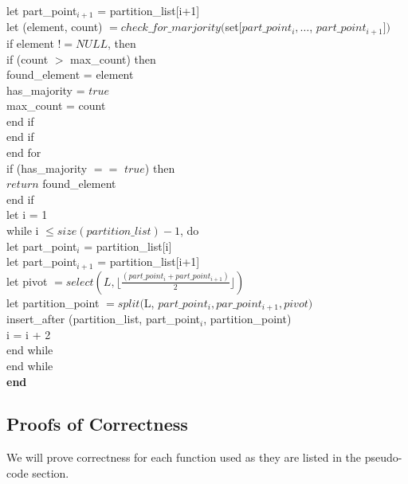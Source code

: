 \documentclass{article}
\begin{document}
      \indent\indent\indent let part\_point$_{i+1}$ = partition\_list[i+1] \\
      \indent\indent\indent let (element, count) $= check\_for\_marjority($set$[part\_point_{i}, \ldots$, $part\_point_{i+1}])$ \\
      \indent\indent\indent if element $!= NULL$, then \\
      \indent\indent\indent\indent if (count $>$ max\_count) then \\
      \indent\indent\indent\indent\indent found\_element = element \\
      \indent\indent\indent\indent\indent has\_majority = $true$ \\
      \indent\indent\indent\indent\indent max\_count = count \\
      \indent\indent\indent\indent end if \\
      \indent\indent\indent end if \\
      \indent\indent end for \\
      \indent\indent if (has\_majority $==$ $true$) then \\
      \indent\indent\indent $return$ found\_element \\
      \indent\indent end if \\
      \indent\indent let i = 1 \\
      \indent\indent while i $\leq size(partition\_list) - 1$, do \\ 
      \indent\indent\indent let part\_point$_{i}$ = partition\_list[i] \\
      \indent\indent\indent let part\_point$_{i+1}$ = partition\_list[i+1] \\
      \indent\indent\indent let pivot $= select(L, \lfloor \frac{(part\_point_{i} + part\_point_{i+1})}{2} \rfloor)$ \\
      \indent\indent\indent let partition\_point $= split($L, $part\_point_{i}, par\_point_{i+1}, pivot)$ \\
      \indent\indent\indent insert\_after (partition\_list, part\_point$_{i}$, partition\_point) \\
      \indent\indent\indent i = i + 2 \\
      \indent\indent end while \\
      \indent end while \\
      \textbf{end} \\
    \subsection{Proofs of Correctness}
      We will prove correctness for each function used as they are listed in the pseudo-code section. \\
\end{document}
